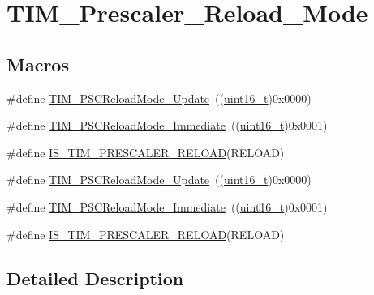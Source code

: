 \hypertarget{group___t_i_m___prescaler___reload___mode}{}\section{T\+I\+M\+\_\+\+Prescaler\+\_\+\+Reload\+\_\+\+Mode}
\label{group___t_i_m___prescaler___reload___mode}
\subsection*{Macros}
\begin{DoxyCompactItemize}
\item 
\#define \hyperlink{group___t_i_m___prescaler___reload___mode_gad76dd05a3ae4e44e040e0e083bd460bf}{T\+I\+M\+\_\+\+P\+S\+C\+Reload\+Mode\+\_\+\+Update}~((\hyperlink{_p_e___types_8h_a1f1825b69244eb3ad2c7165ddc99c956}{uint16\+\_\+t})0x0000)
\item 
\#define \hyperlink{group___t_i_m___prescaler___reload___mode_ga9ba55481ccdcb64268b7b9f2095bfc17}{T\+I\+M\+\_\+\+P\+S\+C\+Reload\+Mode\+\_\+\+Immediate}~((\hyperlink{_p_e___types_8h_a1f1825b69244eb3ad2c7165ddc99c956}{uint16\+\_\+t})0x0001)
\item 
\#define \hyperlink{group___t_i_m___prescaler___reload___mode_ga156317fc6b2c1f6f2e1da9dfa555ecf4}{I\+S\+\_\+\+T\+I\+M\+\_\+\+P\+R\+E\+S\+C\+A\+L\+E\+R\+\_\+\+R\+E\+L\+O\+AD}(R\+E\+L\+O\+AD)
\item 
\#define \hyperlink{group___t_i_m___prescaler___reload___mode_gad76dd05a3ae4e44e040e0e083bd460bf}{T\+I\+M\+\_\+\+P\+S\+C\+Reload\+Mode\+\_\+\+Update}~((\hyperlink{_p_e___types_8h_a1f1825b69244eb3ad2c7165ddc99c956}{uint16\+\_\+t})0x0000)
\item 
\#define \hyperlink{group___t_i_m___prescaler___reload___mode_ga9ba55481ccdcb64268b7b9f2095bfc17}{T\+I\+M\+\_\+\+P\+S\+C\+Reload\+Mode\+\_\+\+Immediate}~((\hyperlink{_p_e___types_8h_a1f1825b69244eb3ad2c7165ddc99c956}{uint16\+\_\+t})0x0001)
\item 
\#define \hyperlink{group___t_i_m___prescaler___reload___mode_ga156317fc6b2c1f6f2e1da9dfa555ecf4}{I\+S\+\_\+\+T\+I\+M\+\_\+\+P\+R\+E\+S\+C\+A\+L\+E\+R\+\_\+\+R\+E\+L\+O\+AD}(R\+E\+L\+O\+AD)
\end{DoxyCompactItemize}


\subsection{Detailed Description}


